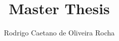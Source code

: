 \documentclass[mscres,icsa,logo,twoside]{infthesis}
\title{Master Thesis}
\author{Rodrigo Caetano de Oliveira Rocha}
\theoremstyle{definition}
\begin{document}
\begin{preliminary}

\maketitle

\begin{acknowledgements}

\end{acknowledgements}

\standarddeclaration


\tableofcontents


\end{preliminary}


%




%



% 

%






\end{document}
